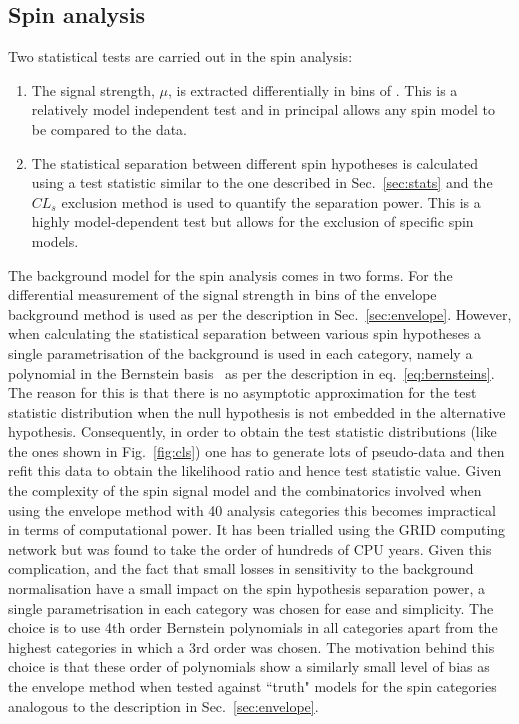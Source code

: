 \subsection{Spin analysis}

Two statistical tests are carried out in the spin analysis:

\begin{enumerate}
  \item The signal strength, $\mu$, is extracted differentially in bins of \abscostheta. This is a relatively model independent test and in principal allows any spin model to be compared to the data.
  \item The statistical separation between different spin hypotheses is calculated using a test statistic similar to the one described in Sec.~\ref{sec:stats} and the $CL_{s}$ exclusion method is used to quantify the separation power. This is a highly model-dependent test but allows for the exclusion of specific spin models.
\end{enumerate}

The background model for the spin analysis comes in two forms. For the differential measurement of the signal strength in bins of \abscostheta the envelope background method is used as per the description in Sec.~\ref{sec:envelope}. However, when calculating the statistical separation between various spin hypotheses a single parametrisation of the background is used in each category, namely a polynomial in the Bernstein basis~\cite{bernsteins1,bernsteins2} as per the description in eq.~\ref{eq:bernsteins}. The reason for this is that there is no asymptotic approximation for the test statistic distribution when the null hypothesis is not embedded in the alternative hypothesis. Consequently, in order to obtain the test statistic distributions (like the ones shown in Fig.~\ref{fig:cls}) one has to generate lots of pseudo-data and then refit this data to obtain the likelihood ratio and hence test statistic value. Given the complexity of the spin signal model and the combinatorics involved when using the envelope method with 40 analysis categories this becomes impractical in terms of computational power. It has been trialled using the GRID computing network but was found to take the order of hundreds of CPU years.
Given this complication, and the fact that small losses in sensitivity to the background normalisation have a small impact on the spin hypothesis separation power, a single parametrisation in each category was chosen for ease and simplicity. The choice is to use 4th order Bernstein polynomials in all categories apart from the highest \abscostheta categories in which a 3rd order was chosen. The motivation behind this choice is that these order of polynomials show a similarly small level of bias as the envelope method when tested against ``truth" models for the spin categories analogous to the description in Sec.~\ref{sec:envelope}.



